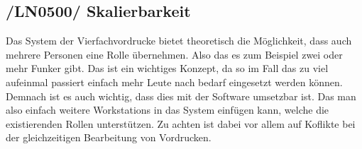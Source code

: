 \subsection{/LN0500/ Skalierbarkeit}
Das System der Vierfachvordrucke bietet theoretisch die Möglichkeit, dass auch mehrere Personen eine Rolle übernehmen. Also das es zum Beispiel zwei oder mehr Funker gibt. Das ist ein wichtiges Konzept, da so im Fall das zu viel aufeinmal passiert einfach mehr Leute nach bedarf eingesetzt werden können. Demnach ist es auch wichtig, dass dies mit der Software umsetzbar ist. Das man also einfach weitere Workstations in das System einfügen kann, welche die existierenden Rollen unterstützen. Zu achten ist dabei vor allem auf Koflikte bei der gleichzeitigen Bearbeitung von Vordrucken.